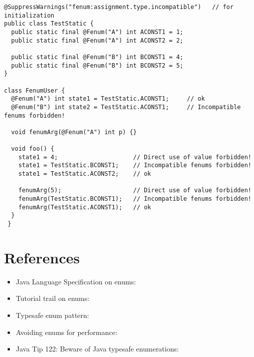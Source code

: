 \begin{Verbatim}
@SuppressWarnings("fenum:assignment.type.incompatible")   // for initialization
public class TestStatic {
  public static final @Fenum("A") int ACONST1 = 1;
  public static final @Fenum("A") int ACONST2 = 2;

  public static final @Fenum("B") int BCONST1 = 4;
  public static final @Fenum("B") int BCONST2 = 5;
}

class FenumUser {
  @Fenum("A") int state1 = TestStatic.ACONST1;     // ok
  @Fenum("B") int state2 = TestStatic.ACONST1;     // Incompatible fenums forbidden!

  void fenumArg(@Fenum("A") int p) {}
	
  void foo() {
    state1 = 4;                     // Direct use of value forbidden!
    state1 = TestStatic.BCONST1;    // Incompatible fenums forbidden!
    state1 = TestStatic.ACONST2;    // ok

    fenumArg(5);                    // Direct use of value forbidden!
    fenumArg(TestStatic.BCONST1);   // Incompatible fenums forbidden!
    fenumArg(TestStatic.ACONST1);   // ok
  }
 }
\end{Verbatim}


\section{References}

\begin{itemize}
\item Java Language Specification on enums:\\

\item Tutorial trail on enums:\\

\item Typesafe enum pattern:\\

\item Avoiding enums for performance:\\

\item Java Tip 122: Beware of Java typesafe enumerations:\\

\end{itemize}